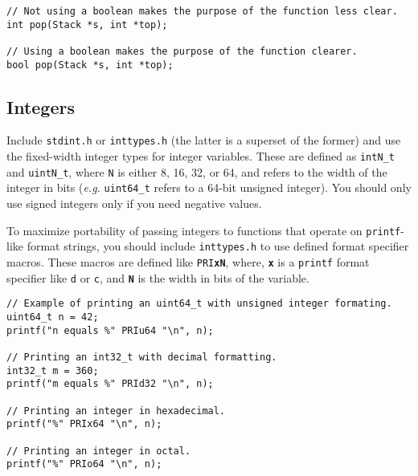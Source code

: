 \documentclass[11pt]{article}
\begin{document}
\begin{lstlisting}
// Not using a boolean makes the purpose of the function less clear.
int pop(Stack *s, int *top);

// Using a boolean makes the purpose of the function clearer.
bool pop(Stack *s, int *top);
\end{lstlisting}

\subsection{Integers}
\noindent Include \texttt{stdint.h} or \texttt{inttypes.h} (the latter is a superset
of the former) and use the fixed-width integer types for integer variables.
These are defined as \texttt{intN\_t} and \texttt{uintN\_t}, where \texttt{N} is
either 8, 16, 32, or 64, and refers to the width of the integer in bits
(\emph{e.g.} \texttt{uint64\_t} refers to a 64-bit unsigned integer). You should
only use signed integers only if you need negative values.

To maximize portability of passing integers to functions that operate on
\texttt{printf}-like format strings, you should include
\texttt{inttypes.h} to use defined format specifier macros. These macros are
defined like \texttt{PRI\textbf{xN}}, where, \texttt{\textbf{x}} is a
\texttt{printf} format specifier like \texttt{d} or \texttt{c}, and
\texttt{\textbf{N}} is the width in bits of the variable.

\begin{lstlisting}
// Example of printing an uint64_t with unsigned integer formating.
uint64_t n = 42;
printf("n equals %" PRIu64 "\n", n);

// Printing an int32_t with decimal formatting.
int32_t m = 360;
printf("m equals %" PRId32 "\n", n);

// Printing an integer in hexadecimal.
printf("%" PRIx64 "\n", n);

// Printing an integer in octal.
printf("%" PRIo64 "\n", n);
\end{lstlisting}
\end{document}
